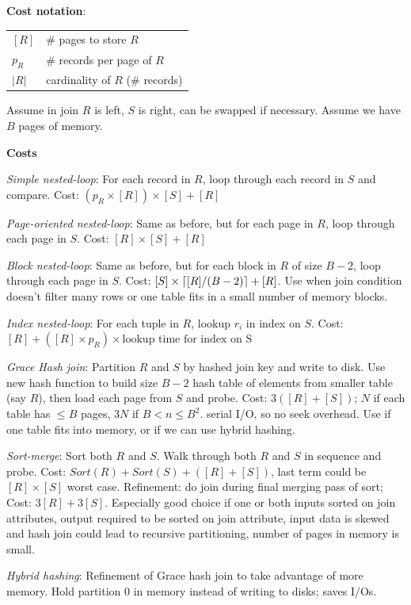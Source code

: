 \documentclass[10pt,landscape]{article}
\DeclarePairedDelimiter{\ceil}{\lceil}{\rceil}
\begin{document}
\begin{multicols}{3}
\textbf{Cost notation}:

\begin{tabular}{@{}ll@{}}
$[R]$   & \# pages to store $R$ \\
$p_R$   & \# records per page of $R$ \\
$|R|$   & cardinality of $R$ (\# records)
\end{tabular}

Assume in join $R$ is left, $S$ is right, can be swapped if necessary. Assume we have $B$ pages of memory.

\textbf{Costs}

\textit{Simple nested-loop}: For each record in $R$, loop through each record in $S$ and compare. Cost: $(p_R \times [R]) \times [S] + [R]$

\textit{Page-oriented nested-loop}: Same as before, but for each page in $R$, loop through each page in $S$. Cost: $[R] \times [S] + [R]$

\textit{Block nested-loop}: Same as before, but for each block in $R$ of size $B-2$, loop through each page in $S$. Cost: $[S]\times\ceil*{[R] / (B-2)} + [R]$. Use when join condition doesn't filter many rows or one table fits in a small number of memory blocks.

\textit{Index nested-loop}: For each tuple in $R$, lookup $r_i$ in index on $S$. Cost: $[R] + ([R] \times p_R) \times \text{lookup time for index on S}$

\textit{Grace Hash join}: Partition $R$ and $S$ by hashed join key and write to disk. Use new hash function to build size $B-2$ hash table of elements from smaller table (say $R$), then load each page from $S$ and probe. Cost: $3([R]+[S])$; $N$ if each table has $\le B$ pages, $3N$ if $B < n \le B^2$. serial I/O, so no seek overhead. Use if one table fits into memory, or if we can use hybrid hashing.

\textit{Sort-merge}: Sort both $R$ and $S$. Walk through both $R$ and $S$ in sequence and probe. Cost: $Sort(R) + Sort(S) + ([R] + [S])$, last term could be $[R] \times [S]$ worst case. Refinement: do join during final merging pass of sort; Cost: $3[R] + 3[S]$. Especially good choice if one or both inputs sorted on join attributes, output required to be sorted on join attribute, input data is skewed and hash join could lead to recursive partitioning, number of pages in memory is small.

\textit{Hybrid hashing}: Refinement of Grace hash join to take advantage of more memory. Hold partition 0 in memory instead of writing to disks; saves I/Os.


\end{multicols}
\end{document}
